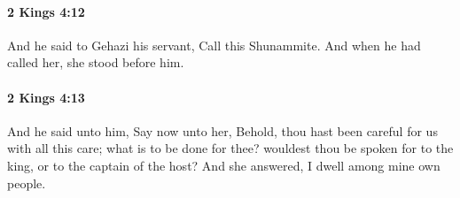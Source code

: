 		\paragraph{2 Kings 4:12} %
			\label{2KINGS-4-12}

			And he said to Gehazi his servant, Call this Shunammite. And when he had called her, she stood before him.


		\paragraph{2 Kings 4:13} %
			\label{2KINGS-4-13}

			And he said unto him, Say now unto her, Behold, thou hast been careful for us with all this care; what is to be done for thee? wouldest thou be spoken for to the king, or to the captain of the host? And she answered, I dwell among mine own people.


